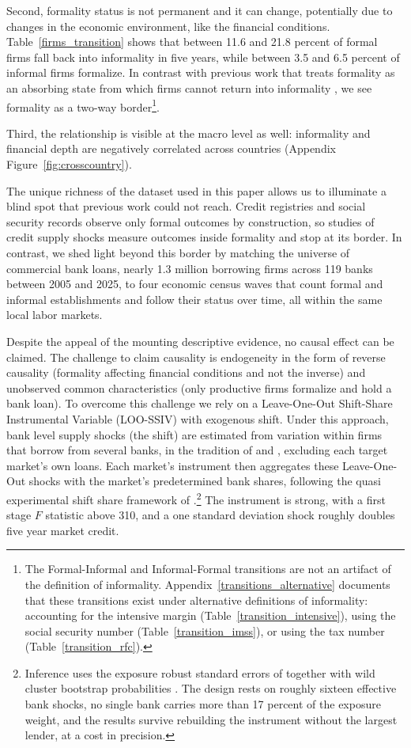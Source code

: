 \documentclass[12pt]{article}
\begin{document}
Second, formality status is not permanent and it can change, potentially due to changes in the economic environment, like the financial conditions. Table~\ref{firms_transition} shows that between 11.6 and 21.8 percent of formal firms fall back into informality in five years, while between 3.5 and 6.5 percent of informal firms formalize. In contrast with previous work that treats formality as an absorbing state from which firms cannot return into informality \citep{meghir2015wages, ulyssea2018firms}, we see formality as a two-way border\footnote{The Formal-Informal and Informal-Formal transitions are not an artifact of the definition of informality. Appendix~\ref{transitions_alternative} documents that these transitions exist under alternative definitions of informality: accounting for the intensive margin (Table~\ref{transition_intensive}), using the social security number (Table~\ref{transition_imss}), or using the tax number (Table~\ref{transition_rfc}).}.

Third, the relationship is visible at the macro level as well: informality and financial depth are negatively correlated across countries (Appendix Figure~\ref{fig:crosscountry}).

The unique richness of the dataset used in this paper allows us to illuminate a blind spot that previous work could not reach. Credit registries and social security records observe only formal outcomes by construction, so studies of credit supply shocks measure outcomes inside formality and stop at its border. In contrast, we shed light beyond this border by matching the universe of commercial bank loans, nearly 1.3 million borrowing firms across 119 banks between 2005 and 2025, to four economic census waves that count formal and informal establishments and follow their status over time, all within the same local labor markets.

Despite the appeal of the mounting descriptive evidence, no causal effect can be claimed. The challenge to claim causality is endogeneity in the form of reverse causality (formality affecting financial conditions and not the inverse) and unobserved common characteristics (only productive firms formalize and hold a bank loan). To overcome this challenge we rely on a Leave-One-Out Shift-Share Instrumental Variable (LOO-SSIV) with exogenous shift. Under this approach, bank level supply shocks (the shift) are estimated from variation within firms that borrow from several banks, in the tradition of \citet{khwaja2008tracing} and \citet{amiti2018much}, excluding each target market's own loans. Each market's instrument then aggregates these Leave-One-Out shocks with the market's predetermined bank shares, following the quasi experimental shift share framework of \citet{borusyak2022quasi}.\footnote{Inference uses the exposure robust standard errors of \citet{adao2019shiftshare} together with wild cluster bootstrap probabilities \citep{cameron2008bootstrap}. The design rests on roughly sixteen effective bank shocks, no single bank carries more than 17 percent of the exposure weight, and the results survive rebuilding the instrument without the largest lender, at a cost in precision.} The instrument is strong, with a first stage $F$ statistic above 310, and a one standard deviation shock roughly doubles five year market credit.
\end{document}
